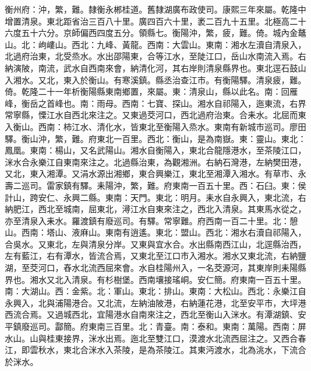 \begin{pinyinscope}
衡州府：沖，繁，難。隸衡永郴桂道。舊隸湖廣布政使司。康熙三年來屬。乾隆中增置清泉。東北距省治三百八十里。廣四百六十里，袤二百九十五里。北極高二十六度五十六分。京師偏西四度五分。領縣七。衡陽沖，繁，疲，難。倚。城內金鼇山。北：岣嶁山。西北：九峰、黃龍。西南：大雲山。東南：湘水左瀆自清泉入，北過府治東，北受烝水。水出邵陽東，合等江水，至陡江口，岳山水南流入焉。右納演陂，南流，武水自西南來會，納清化河，其右岸則清泉縣界也。東北逕石鼓山入湘水。又北，東入於衡山。有寒溪鎮。縣丞治查江市。有衡陽驛。清泉疲，難。倚。乾隆二十一年析衡陽縣東南鄉置，來屬。東：清泉山，縣以此名。南：回雁峰，衡岳之首峰也。南：雨母。西南：七寶、探山。湘水自祁陽入，迤東流，右界常寧縣，慄江水自西北來注之。又東過茭河口，西北過府治東。合耒水。北屈而東入衡山。西南：柿江水、清化水，皆東北至衡陽入烝水。東南有新城市巡司。廖田驛。衡山沖，繁，難。府東北一百里。西北：衡山，是為南嶽。東：靈山。東北：鳳凰。東南：楊山，又名武陽山。湘水自衡陽入，東北合龍隱港水，至茶陵江口，洣水合永樂江自東南來注之。北過縣治東，為觀湘洲。右納石灣港，左納樊田港，又北，東入湘潭。又涓水源出湘鄉，東合興樂江，東北至湘潭入湘水。有草市、永壽二巡司。雷家鎮有驛。耒陽沖，繁，難。府東南一百五十里。西：石臼。東：侯計山，跨安仁、永興二縣。東南：天門。東北：明月。耒水自永興入，東北流，右納肥江，西北至城南，屈東北，潯江水自東來注之，西北入清泉。其東馬水從之，亦至清泉入耒水。羅渡鎮有廢巡司。有驛。常寧難。府西南一百二十里。北：憩山。西南：塔山、液麻山。東南有逍遙。東北：盟山。西北：湘水右瀆自祁陽入，合吳水。又東北，左與清泉分岸。又東與宜水合。水出縣南西江山，北逕縣治西，左有藍江，右有潭水，皆流合焉，又東北至江口市入湘水。湘水又東北流，右納鹽湖，至茭河口，舂水北流西屈來會。水自桂陽州入，一名茭源河，其東岸則耒陽縣界也。湘水又北入清泉。有杉樹堡。西南壤接瑤峒。安仁簡。府東南一百五十里。南：大湖山。西：金紫。北：軍山。東北：排山。東南：大松山。西北：永樂江自永興入，北與浦陽港合。又北流，左納油陂港，右納蓮花港，北至安平市，大坪港西流合焉。又過城西北，宜陽港水自南來注之，西北至衡山入洣水。有潭湖鎮、安平鎮廢巡司。酃簡。府東南三百里。北：青臺。南：泰和。東南：萬陽。西南：屏水山。山與桂東接界，洣水出焉。迤北至雙江口，漠渡水北流西屈注之。又西合春江，即雲秋水，東北合洣水入茶陵，是為茶陵江。其東沔渡水，北為洮水，下流合於洣水。


\end{pinyinscope}
